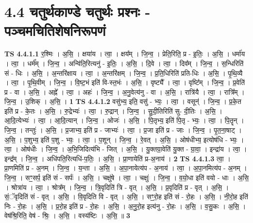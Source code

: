 \documentclass[17pt]{extarticle}
\begin{document}
\section*{ 4.4      चतुर्थकाण्डे चतुर्थः प्रश्नः - पञ्चमचितिशेषनिरूपणं }
                                \textbf{ TS 4.4.1.1} \newline
                  र॒श्मिः । अ॒सि॒ । क्षया॑य । त्वा॒ । क्षय᳚म् । जि॒न्व॒ । प्रेति॒रिति॒ प्र - इ॒तिः॒ । अ॒सि॒ । धर्मा॑य । त्वा॒ । धर्म᳚म् । जि॒न्व॒ । अन्वि॑ति॒रित्यनु॑ - इ॒तिः॒ । अ॒सि॒ । दि॒वे । त्वा॒ । दिव᳚म् । जि॒न्व॒ । स॒न्धिरिति॑ सं - धिः । अ॒सि॒ । अ॒न्तरि॑क्षाय । त्वा॒ । अ॒न्तरि॑क्षम् । जि॒न्व॒ । प्र॒ति॒धिरिति॑ प्रति-धिः । अ॒सि॒ । पृ॒थि॒व्यै । त्वा॒ । पृ॒थि॒वीम् । जि॒न्व॒ । वि॒ष्ट॒भं इति॑ वि-स्त॒भंः । अ॒सि॒ । वृष्ट्यै᳚ । त्वा॒ । वृष्टि᳚म् । जि॒न्व॒ । प्र॒वेति॑ प्र - वा । अ॒सि॒ । अह्ने᳚ । त्वा॒ । अहः॑ । जि॒न्व॒ । अ॒नु॒वेत्य॑नु - वा । अ॒सि॒ । रात्रि॑यै । त्वा॒ । रात्रि᳚म् । जि॒न्व॒ । उ॒शिक् । अ॒सि॒ । \textbf{  1} \newline
                  \newline
                                \textbf{ TS 4.4.1.2} \newline
                  वसु॑भ्य॒ इति॒ वसु॑ - भ्यः॒ । त्वा॒ । वसून्॑ । जि॒न्व॒ । प्र॒के॒त इति॑ प्र - के॒तः । अ॒सि॒ । रु॒द्रेभ्यः॑ । त्वा॒ । रु॒द्रान् । जि॒न्व॒ । सु॒दी॒तिरिति॑ सु- दी॒तिः । अ॒सि॒ । आ॒दि॒त्येभ्यः॑ । त्वा॒ । आ॒दि॒त्यान् । जि॒न्व॒ । ओजः॑ । अ॒सि॒ । पि॒तृभ्य॒ इति॑ पि॒तृ - भ्यः॒ । त्वा॒ । पि॒तॄन् । जि॒न्व॒ । तन्तुः॑ । अ॒सि॒ । प्र॒जाभ्य॒ इति॑ प्र - जाभ्यः॑ । त्वा॒ । प्र॒जा इति॑ प्र - जाः । जि॒न्व॒ । पृ॒त॒ना॒षाट् । अ॒सि॒ । प॒शुभ्य॒ इति॑ प॒शु - भ्यः॒ । त्वा॒ । प॒शून् । जि॒न्व॒ । रे॒वत् । अ॒सि॒ । ओष॑धीभ्य॒ इत्योष॑धि - भ्यः॒ । त्वा॒ । ओष॑धीः । जि॒न्व॒ । अ॒भि॒जिदित्य॑भि - जित् । अ॒सि॒ । यु॒क्तग्रा॒वेति॑ यु॒क्त - ग्रा॒वा॒ । इन्द्रा॑य । त्वा॒ । इन्द्र᳚म् । जि॒न्व॒ । अधि॑पति॒रित्यधि॑-प॒तिः॒ । अ॒सि॒ । प्रा॒णायेति॑ प्र-अ॒नाय॑ । \textbf{  2} \newline
                  \newline
                                \textbf{ TS 4.4.1.3} \newline
                  त्वा॒ । प्रा॒णमिति॑ प्र - अ॒नम् । जि॒न्व॒ । य॒न्ता । अ॒सि॒ । अ॒पा॒नायेत्य॑प - अ॒नाय॑ । त्वा॒ । अ॒पा॒नमित्य॑प - अ॒नम् । जि॒न्व॒ । सꣳ॒॒सर्प॒ इति॑ सं - सर्पः॑ । अ॒सि॒ । चक्षु॑षे । त्वा॒ । चक्षुः॑ । जि॒न्व॒ । व॒यो॒धा इति॑ वयो - धाः । अ॒सि॒ । श्रोत्रा॑य । त्वा॒ । श्रोत्र᳚म् । जि॒न्व॒ । त्रि॒वृदिति॑ त्रि - वृत् । अ॒सि॒ । प्र॒वृदिति॑ प्र - वृत् । अ॒सि॒ । सं॒ॅवृदिति॑ सं - वृत् । अ॒सि॒ । वि॒वृदिति वि - वृत् । अ॒सि॒ । सꣳ॒॒रो॒ह इति॑ सं - रो॒हः । अ॒सि॒ । नी॒रो॒ह इति॑ निः - रो॒हः । अ॒सि॒ । प्र॒रो॒ह इति॑ प्र - रो॒हः । अ॒सि॒ । अ॒नु॒रो॒ह इत्य॑नु - रो॒हः । अ॒सि॒ । व॒सु॒कः । अ॒सि॒ । वेष॑श्रि॒रिति॒ वेष॑ - श्रिः॒ । अ॒सि॒ । वस्य॑ष्टिः । अ॒सि॒ ॥ \textbf{  3} \newline
\end{document}
